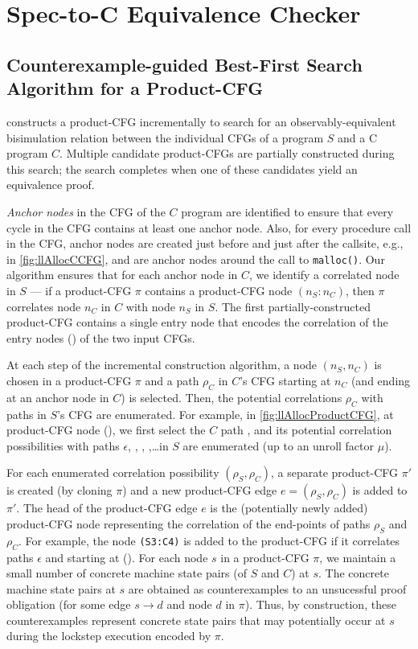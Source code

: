 \section{Spec-to-C Equivalence Checker}
\label{sec:spectocalgo}

\subsection[Counterexample-guided Product-CFG Construction]{Counterexample-guided Best-First Search Algorithm for a Product-CFG}
\label{sec:searchalgo}
\toolName{} constructs a product-CFG incrementally to search for
an observably-equivalent bisimulation relation between
the individual CFGs of a \SpecL{} program $S$ and a C program $C$.
Multiple candidate product-CFGs are partially constructed
during this search; the search completes when one of these
candidates yield an equivalence proof.

{\em Anchor nodes} in the CFG of the $C$ program
are identified to ensure that every cycle in the CFG
contains at least one anchor node. Also, for
every procedure call in the CFG, anchor nodes
are created just before and just after the callsite, e.g.,
in \cref{fig:llAllocCCFG},  and  are anchor
nodes around the call to {\tt malloc()}.
Our algorithm
ensures that for each anchor node in $C$, we
identify a correlated node in $S$ --- if
a product-CFG $\pi$
contains a product-CFG node $(n_S:n_C)$, then $\pi$
correlates node $n_C$
in $C$ with node $n_S$ in $S$.
The
first partially-constructed product-CFG
contains a single entry node
that encodes the correlation of the entry nodes ()
of the two input CFGs.

At each step of the incremental construction algorithm,
a node $(n_S,n_C)$ is chosen in a product-CFG $\pi$
and a path $\rho_C$ in $C$'s CFG starting at $n_C$ (and
ending at an anchor node in $C$) is selected.
Then, the potential correlations $\rho_C$
with paths
in $S$'s CFG are enumerated.
For
example, in \cref{fig:llAllocProductCFG}, at product-CFG
node (), we first select the $C$ path ,
and its potential correlation possibilities
with paths $\epsilon$, , , ,\ldots in $S$ are enumerated (up to an unroll factor $\mu$).

For each enumerated correlation possibility $(\rho_S,\rho_C)$,
a separate
product-CFG $\pi'$ is created (by cloning $\pi$)
and a new product-CFG
edge $e=(\rho_S,\rho_C)$ is added to $\pi'$.
The head of the product-CFG edge $e$ is the
(potentially newly added) product-CFG node representing
the correlation of the end-points of paths $\rho_S$
and $\rho_C$. For example, the node {\tt (S3:C4)} is added
to the product-CFG if it correlates paths $\epsilon$ and 
starting at ().
For each node $s$ in a product-CFG $\pi$, we maintain
a small number of
concrete machine state pairs (of $S$ and $C$) at $s$.
The concrete
machine state pairs at $s$
are obtained as
counterexamples to an unsucessful proof
obligation  (for
some edge $s \rightarrow d$ and node $d$ in $\pi$).
Thus, by construction, these counterexamples represent
concrete state pairs that
may potentially occur
at $s$ during the lockstep execution encoded
by $\pi$.

